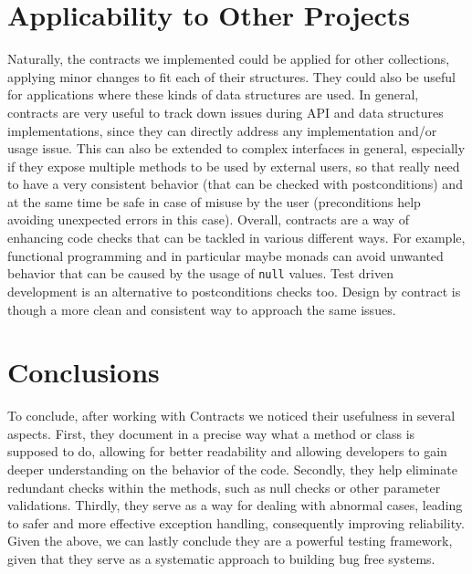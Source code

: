 \documentclass[a4paper]{article}
\begin{document}
\section{Applicability to Other Projects}
Naturally, the contracts we implemented could be applied for other collections, applying minor changes to fit each of their structures. They could also be useful for applications where these kinds of data structures are used. In general, contracts are very useful to track down issues during API and data structures implementations, since they can directly address any implementation and/or usage issue. This can also be extended to complex interfaces in general, especially if they expose multiple methods to be used by external users, so that really need to have a very consistent behavior (that can be checked with postconditions) and  at the same time be safe in case of misuse by the user (preconditions help avoiding unexpected errors in this case). Overall, contracts are a way of enhancing code checks that can be tackled in various different ways. For example, functional programming and in particular maybe monads can avoid unwanted behavior that can be caused by the usage of \lstinline{null} values. Test driven development is an alternative to postconditions checks too. Design by contract is though a more clean and consistent way to approach the same issues.

\section{Conclusions}
To conclude, after working with Contracts we noticed their usefulness in several aspects. First, they document in a precise way what a method or class is supposed to do, allowing for better readability and allowing developers to gain deeper understanding on the behavior of the code. Secondly, they help eliminate redundant checks within the methods, such as null checks or other parameter validations. Thirdly, they serve as a way for dealing with abnormal cases, leading to safer and more effective exception handling, consequently improving reliability. Given the above, we can lastly conclude they are a powerful testing framework, given that they serve as a systematic approach to building bug free systems.
\end{document}
